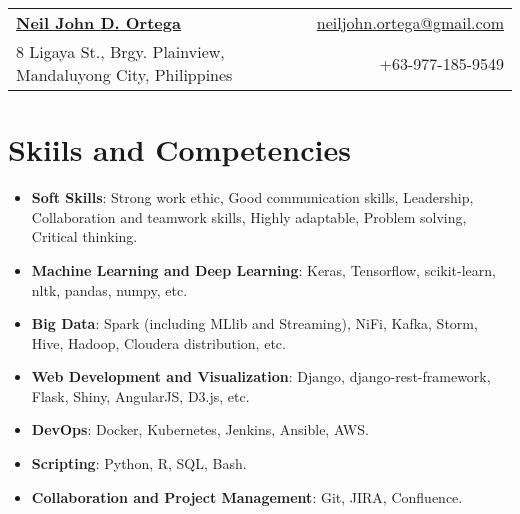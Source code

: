 \documentclass[letterpaper,11pt]{article}
\newcommand{\resumeItemInline}[2]{
  \item\small{
    \textbf{#1}{: #2 \vspace{-2pt}}
  }
}
\newcommand{\resumeSubItemInline}[2]{\resumeItemInline{#1}{#2}\vspace{-6pt}}
\newcommand{\resumeSubHeadingListStart}{\begin{itemize}[leftmargin=*]}
\newcommand{\resumeSubHeadingListEnd}{\end{itemize}\vspace{-5pt}}
\begin{document}
\begin{tabular*}{\textwidth}{l@{\extracolsep{\fill}}r}
  \textbf{\href{https://www.linkedin.com/in/neiljdo/}{\Large Neil John D. Ortega}} & \href{mailto:neiljohn.ortega@gmail.com}{neiljohn.ortega@gmail.com}\\
  8 Ligaya St., Brgy. Plainview, Mandaluyong City, Philippines & +63-977-185-9549\\
\end{tabular*}


\section{Skiils and Competencies}
  \resumeSubHeadingListStart
    \resumeSubItemInline{Soft Skills}
      {Strong work ethic, Good communication skills, Leadership, Collaboration and teamwork skills, Highly adaptable, Problem solving, Critical thinking.}
    \resumeSubItemInline{Machine Learning and Deep Learning}
      {Keras, Tensorflow, scikit-learn, nltk, pandas, numpy, etc.}
    \resumeSubItemInline{Big Data}
      {Spark (including MLlib and Streaming), NiFi, Kafka, Storm, Hive, Hadoop, Cloudera distribution, etc.}
    \resumeSubItemInline{Web Development and Visualization}
      {Django, django-rest-framework, Flask, Shiny, AngularJS, D3.js, etc.}
    \resumeSubItemInline{DevOps}
      {Docker, Kubernetes, Jenkins, Ansible, AWS.}
    \resumeSubItemInline{Scripting}
      {Python, R, SQL, Bash.}
    \resumeSubItemInline{Collaboration and Project Management}
      {Git, JIRA, Confluence.}
  \resumeSubHeadingListEnd


\end{document}
